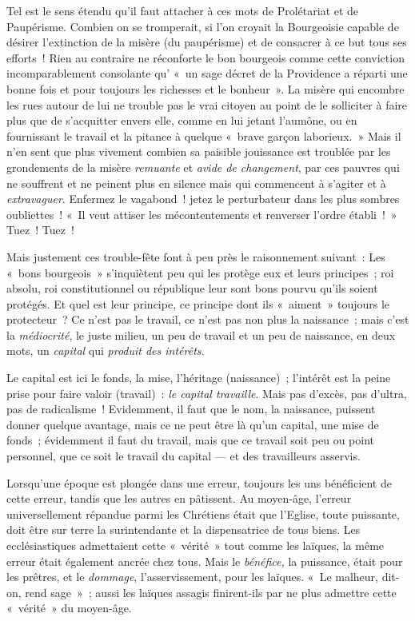\documentclass[french,twoside]{book} %
\begin{document}
Tel est le sens étendu qu’il faut attacher à ces mots de Prolétariat et de Paupérisme. Combien on se tromperait, si l’on croyait la Bourgeoisie capable de désirer l’extinction de la misère (du paupérisme) et de consacrer à ce but tous ses efforts ! Rien au contraire ne réconforte le bon bourgeois comme cette conviction incomparablement consolante qu’ « un sage décret de la Providence a réparti une bonne fois et pour toujours les richesses et le bonheur ». La misère qui encombre les rues autour de lui ne trouble pas le vrai citoyen au point de le solliciter à  faire plus que de s’acquitter envers elle, comme en lui jetant l’aumône, ou en fournissant le travail et la pitance à quelque « brave garçon laborieux. » Mais il n’en sent que plus vivement combien sa paisible jouissance est troublée par les grondements de la misère \emph{remuante} et \emph{avide de changement}, par ces pauvres qui ne souffrent et ne peinent plus en silence mais qui commencent à s’agiter et à \emph{extravaguer}. Enfermez le vagabond ! jetez le perturbateur dans les plus sombres oubliettes ! « Il veut attiser les mécontentements et renverser l’ordre établi ! » Tuez ! Tuez !\par
Mais justement ces trouble-fête font à peu près le raisonnement suivant : Les « bons bourgeois » s’inquiètent peu qui les protège eux et leurs principes ; roi absolu, roi constitutionnel ou république leur sont bons pourvu qu’ils soient protégés. Et quel est leur principe, ce principe dont ils « aiment » toujours le protecteur ? Ce n’est pas le travail, ce n’est pas non plus la naissance ; mais c’est la \emph{médiocrité}, le juste milieu, un peu de travail et un peu de naissance, en deux mots, un \emph{capital} qui \emph{produit des intérêts.}\par
Le capital est ici le fonds, la mise, l’héritage (naissance) ; l’intérêt est la peine prise pour faire valoir (travail) : \emph{le capital travaille}. Mais pas d’excès, pas d’ultra, pas de radicalisme ! Evidemment, il faut que le nom, la naissance, puissent donner quelque avantage, mais ce ne peut être là qu’un capital, une mise de fonds ; évidemment il faut du travail, mais que ce travail soit peu ou point personnel, que ce soit le travail du capital — et des travailleurs asservis.\par
Lorsqu’une époque est plongée dans une erreur, toujours les uns bénéficient de cette erreur, tandis que les autres en pâtissent. Au moyen-âge, l’erreur universellement répandue parmi les Chrétiens était que l’Eglise, toute puissante, doit être sur terre la surintendante et la dispensatrice de tous biens. Les  ecclésiastiques admettaient cette « vérité » tout comme les laïques, la même erreur était également ancrée chez tous. Mais le \emph{bénéfice,} la puissance, était pour les prêtres, et le \emph{dommage}, l’asservissement, pour les laïques. « Le malheur, dit-on, rend sage » ; aussi les laïques assagis finirent-ils par ne plus admettre cette « vérité » du moyen-âge.\par
\end{document}
